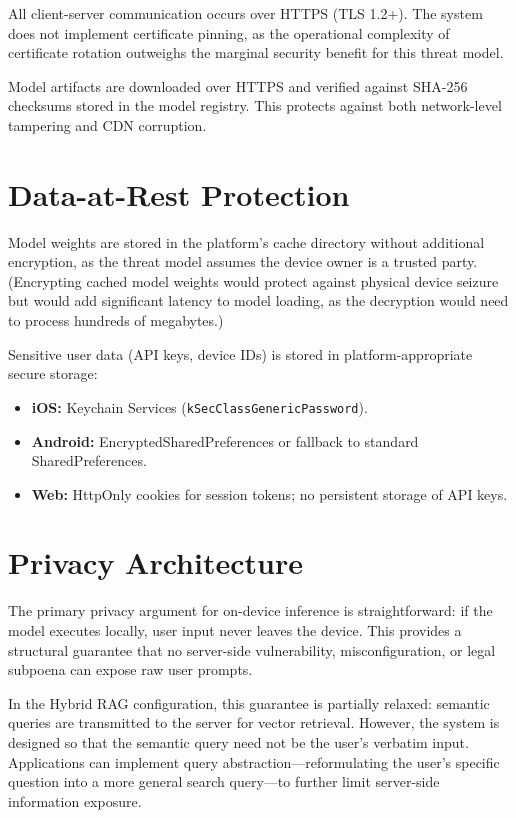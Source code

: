 \documentclass[12pt, letterpaper, twoside]{report}
\begin{document}
All client-server communication occurs over HTTPS (TLS 1.2+). The system does not implement certificate pinning, as the operational complexity of certificate rotation outweighs the marginal security benefit for this threat model.

Model artifacts are downloaded over HTTPS and verified against SHA-256 checksums stored in the model registry. This protects against both network-level tampering and CDN corruption.

\section{Data-at-Rest Protection}
\label{sec:at_rest}

Model weights are stored in the platform's cache directory without additional encryption, as the threat model assumes the device owner is a trusted party. (Encrypting cached model weights would protect against physical device seizure but would add significant latency to model loading, as the decryption would need to process hundreds of megabytes.)

Sensitive user data (API keys, device IDs) is stored in platform-appropriate secure storage:
\begin{itemize}[itemsep=1pt, topsep=2pt, parsep=0pt]
\item \textbf{iOS:} Keychain Services (\texttt{kSecClassGenericPassword}).
\item \textbf{Android:} EncryptedSharedPreferences or fallback to standard SharedPreferences.
\item \textbf{Web:} HttpOnly cookies for session tokens; no persistent storage of API keys.
\end{itemize}

\section{Privacy Architecture}
\label{sec:privacy_arch}

The primary privacy argument for on-device inference is straightforward: if the model executes locally, user input never leaves the device. This provides a structural guarantee that no server-side vulnerability, misconfiguration, or legal subpoena can expose raw user prompts.

In the Hybrid RAG configuration, this guarantee is partially relaxed: semantic queries are transmitted to the server for vector retrieval. However, the system is designed so that the semantic query need not be the user's verbatim input. Applications can implement query abstraction---reformulating the user's specific question into a more general search query---to further limit server-side information exposure.
\end{document}
